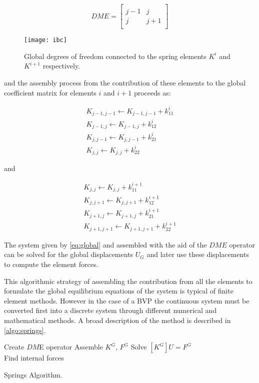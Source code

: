 \[DME = \left[ {\begin{array}{*{20}{c}}
{}&{}\\
{j - 1}&j\\
j&{j + 1}\\
{}&{}
\end{array}} \right]\]

\begin{figure}[H]
\centering
\texttt{[image: ibc]}
\caption{Global degrees of freedom connected to the spring elements $K^i$ and $K^{i+1}$ respectively.}
\label{fig:IBC}
\end{figure}

and the assembly process from the contribution of these elements to the global coefficient matrix for elements $i$ and $i+1$ proceeds as:


\[\begin{array}{l}
{K_{j - 1,j - 1}} \leftarrow {K_{j - 1,j - 1}} + k_{11}^i\\
{K_{j - 1,j}} \leftarrow {K_{j - 1,j}} + k_{12}^i\\
{K_{j,j - 1}} \leftarrow {K_{j,j - 1}} + k_{21}^i\\
{K_{j,j}} \leftarrow {K_{j,j}} + k_{22}^i
\end{array}\]

and

\[\begin{array}{l}
{K_{j,j}} \leftarrow {K_{j,j}} + k_{11}^{i + 1}\\
{K_{j,j + 1}} \leftarrow {K_{j,j + 1}} + k_{12}^{i + 1}\\
{K_{j + 1,j}} \leftarrow {K_{j + 1,j}} + k_{21}^{i + 1}\\
{K_{j + 1,j + 1}} \leftarrow {K_{j + 1,j + 1}} + k_{22}^{i + 1}
\end{array}\]

The system given by \cref{eq:global} and assembled with the aid of the $DME$ operator can be solved for the global displacements $U_G$ and later use these displacements to compute the element forces.

This algorithmic strategy of assembling the contribution from all the elements to formulate the global equilibrium equations of the system is typical of finite element methods. However in the case of a BVP the continuous system must be converted first into a discrete system through different numerical and mathematical methods. A broad description of the method is described in \cref{algo:springs}.

\begin{algorithm}[H]
    \SetAlgoLined
    Create $DM$E operator\;
    Assemble $K^G$, $F^G$\;
    Solve $[K^G]U=F^G$\\
    Find internal forces
    \caption{Springs Algorithm.}
    \label{algo:springs}    
\end{algorithm}

